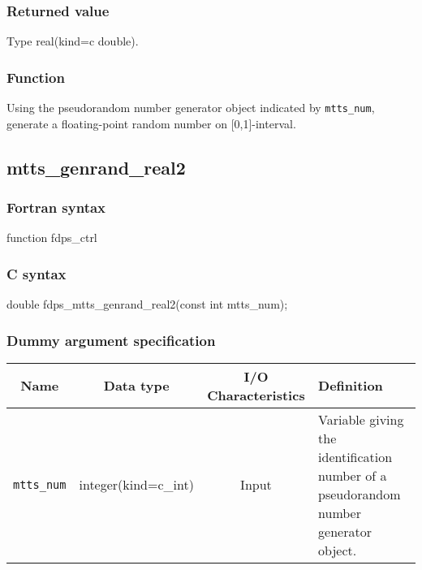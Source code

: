 \subsubsection*{Returned value}
Type real(kind=c double).

\subsubsection*{Function}
Using the pseudorandom number generator object indicated by \texttt{mtts\_num}, generate a floating-point random number on [0,1]-interval.
\clearpage

\subsection{mtts\_genrand\_real2}
\subsubsection*{Fortran syntax}
\begin{screen}
\begin{spverbatim}  
function fdps_ctrl%
\end{spverbatim}
\end{screen}

\subsubsection*{C syntax}
\begin{screen}
\begin{spverbatim}  
double fdps_mtts_genrand_real2(const int mtts_num);
\end{spverbatim}
\end{screen}

\subsubsection*{Dummy argument specification}
\begin{table}[h]
\begin{tabularx}{\linewidth}{cccX}
\toprule
\rowcolor{Snow2}
Name & Data type & I/O Characteristics & Definition \\
\midrule
\verb|mtts_num| & integer(kind=c\_int) & Input & Variable giving the identification number of a pseudorandom number generator object.\\
\bottomrule
\end{tabularx}
\end{table}


